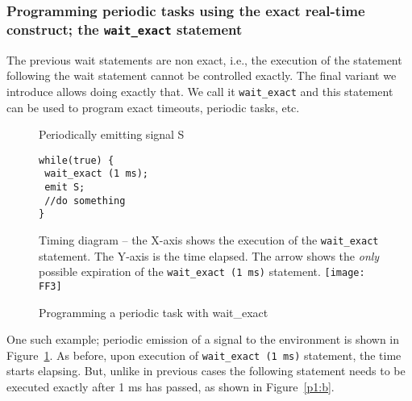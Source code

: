 \subsubsection{Programming periodic tasks using the exact real-time
  construct; the \texttt{wait\_exact} statement}
\label{sec:progr-using-exact}

The previous wait statements are non exact, i.e., the 
execution of the statement following the wait statement cannot be
controlled exactly. The final variant we introduce allows doing exactly
that. We call it \texttt{wait\_exact} and this statement can be used to
program exact timeouts, periodic tasks, etc.

\begin{figure}[t!]
  \centering
	\vspace{-10pt}
        \begin{SubFloat}{\label{pp:a}Periodically emitting signal S}
        \begin{lstlisting}[style=sysj,morekeywords={emit,trap,pause,exit,wait_exact}]
while(true) { 
 wait_exact (1 ms); 
 emit S; 
 //do something 
}
\end{lstlisting}
\end{SubFloat}

\begin{SubFloat}{\label{p1:b}Timing diagram -- the X-axis shows the
    execution of the \texttt{wait\_exact} statement. The Y-axis is the
    time elapsed. The arrow shows the \textit{only} possible expiration
    of the \texttt{wait\_exact (1 ms)} statement.}
  \texttt{[image: FF3]}
\end{SubFloat}
  \caption{Programming a periodic task with wait\_exact}
  \label{fig:p1}
  \vspace{-10pt}
\end{figure}

One such example; periodic emission of a signal to the environment is
shown in Figure~\ref{fig:p1}. As before, upon execution of
\texttt{wait\_exact (1 ms)} statement, the time starts elapsing. But,
unlike in previous cases the following statement needs to be executed
exactly after 1 ms has passed, as shown in Figure~\ref{p1:b}.



